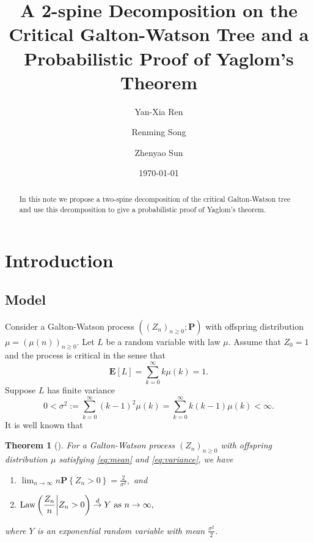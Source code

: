 \documentclass[12pt]{amsart}
\title[A 2-spine decomposition and Yaglom's theorem]{\large A 2-spine Decomposition on the Critical Galton-Watson Tree and a Probabilistic Proof of Yaglom's Theorem}
\author{Yan-Xia Ren}
\author{Renming Song}
\author{Zhenyao Sun}
\date{\today}
\newtheorem{thm}{Theorem}[section]
\numberwithin{equation}{section}
\newcommand{\expr}[1]{\left( #1 \right)}
\newcommand{\set}[1]{\left\{ #1 \right\}}
\newcommand{\law}{\text{\rm Law}}
\newcommand{\tolaw}{\stackrel{d}{\to}}
\newcommand{\expct}{\mathbf E}
\newcommand{\bP}{\mathbf P}\newcommand{\bbP}{\mathbb P}\newcommand{\cP}{\mathcal P}
\begin{document}
\begin{abstract}
	In this note  we propose a two-spine decomposition of the critical 
	Galton-Watson 
	tree and use this decomposition to give a probabilistic proof of Yaglom's theorem.
\end{abstract}
	\maketitle	
\section{Introduction}
\subsection{Model}
\label{sec:model}
	Consider a Galton-Watson process $((Z_n)_{n\ge0}; \bP )$ with offspring distribution $\mu=(\mu(n))_{n\ge 0}$.
	Let $L$ be a random variable with law $\mu$. Assume that $Z_0=1$ and the process is critical in the sense that
\begin{equation}
\label{eq:mean}
		\expct [L]
	=
		\sum_{k=0}^\infty k \mu(k)
	= 
		1.
\end{equation}
	Suppose $L$ has finite variance
\begin{equation}
\label{eq:variance}
		0	
	<	
		\sigma^2
	:=
		\sum_{k=0}^\infty  (k-1)^2 \mu(k)
	=
		\sum_{k=0}^\infty k(k-1) \mu(k)
	<
		\infty.
\end{equation}
	It is well known that
\begin{thm}[\cite{kesten1966galton}]
\label{thm:kesten}
	For a Galton-Watson process $(Z_n)_{n\ge 0}$ with offspring distribution $\mu$ satisfying \eqref{eq:mean} and \eqref{eq:variance}, we have
\begin{enumerate}
\item
\label{thm:kolmogorov}
	$\displaystyle \lim_{n \to \infty} n \bP \set{Z_n>0} = \frac{2}{\sigma^2},$ and
\item
\label{thm:yaglom}
	$\displaystyle	\law\expr{\frac{Z_n}{n}\bigg| Z_n>0}\tolaw Y \ \text{as }n\to\infty,$ 
\end{enumerate}
	where $Y$ is an exponential random variable with mean $\frac{\sigma^2}{2}$.
\end{thm}
\end{document}
